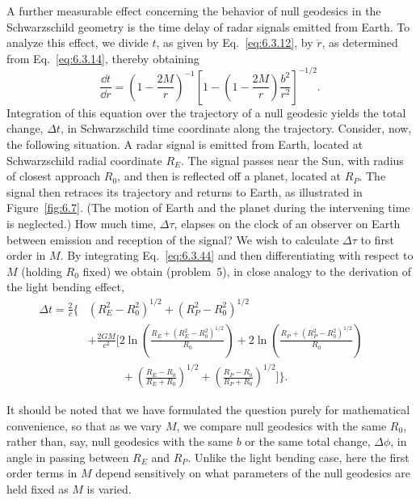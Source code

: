 A further measurable effect concerning the behavior of null geodesics in the
Schwarzschild geometry is the time delay of radar signals emitted from Earth. To
analyze this effect, we divide \(t\), as given by Eq.~\eqref{eq:6.3.12}, by
\(\dot r\), as determined from Eq.~\eqref{eq:6.3.14}, thereby obtaining
\begin{equation}
  \frac{\dd t}{\dd r}=\left(1-\frac{2M}{r}\right)^{-1}
  \left[1-\left(1-\frac{2M}{r}\right)\frac{b^2}{r^2}\right]^{-1/2}.
  \tag{6.3.44}\label{eq:6.3.44}
\end{equation}
Integration of this equation over the trajectory of a null geodesic yields the
total change, \(\Delta t\), in Schwarzschild time coordinate along the
trajectory. Consider, now, the following situation. A radar signal is emitted
from Earth, located at Schwarzschild radial coordinate \(R_E\). The signal passes
near the Sun, with radius of closest approach \(R_0\), and then is reflected off a
planet, located at \(R_P\). The signal then retraces its trajectory and returns to
Earth, as illustrated in Figure~\ref{fig:6.7}. (The motion of Earth and the planet
during the intervening time is neglected.) How much time, \(\Delta\tau\), elapses
on the clock of an observer on Earth between emission and reception of the signal?
We wish to calculate \(\Delta\tau\) to first order in \(M\). By integrating
Eq.~\eqref{eq:6.3.44} and then differentiating with respect to \(M\) (holding
\(R_0\) fixed) we obtain (problem~5), in close analogy to the derivation of the
light bending effect,
\begin{align}
  \Delta t=\frac{2}{c}\biggl\{
    &(R_E^2-R_0^2)^{1/2}+(R_P^2-R_0^2)^{1/2}\nonumber\\
    &+\frac{2GM}{c^2}\biggl[
      2\ln\left(\frac{R_E+(R_E^2-R_0^2)^{1/2}}{R_0}\right)
      +2\ln\left(\frac{R_P+(R_P^2-R_0^2)^{1/2}}{R_0}\right)\nonumber\\
    &\qquad\quad+\left(\frac{R_E-R_0}{R_E+R_0}\right)^{1/2}
      +\left(\frac{R_P-R_0}{R_P+R_0}\right)^{1/2}
    \biggr]\biggr\}.
  &&\tag{6.3.45}\label{eq:6.3.45}
\end{align}

It should be noted that we have formulated the question purely for mathematical
convenience, so that as we vary \(M\), we compare null geodesics with the same
\(R_0\), rather than, say, null geodesics with the same \(b\) or the same total
change, \(\Delta\phi\), in angle in passing between \(R_E\) and \(R_P\). Unlike
the light bending case, here the first order terms in \(M\) depend sensitively on
what parameters of the null geodesics are held fixed as \(M\) is varied.

